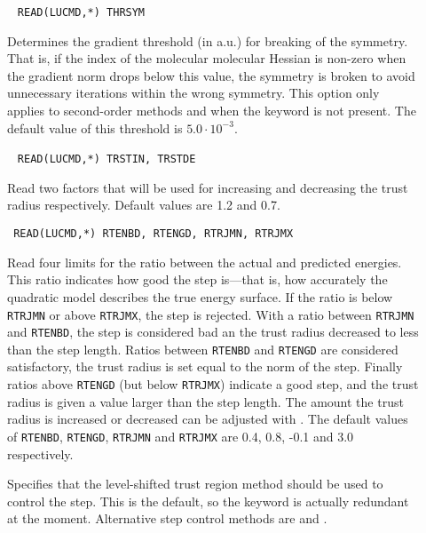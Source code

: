\begin{description}
\item[]\verb| |
\newline
\verb|READ(LUCMD,*) THRSYM|

Determines the gradient threshold (in a.u.) for breaking of the
symmetry. That is, if the index of the
molecular molecular Hessian is non-zero when the gradient norm
drops below this value, the symmetry is broken to avoid unnecessary
iterations within the wrong symmetry. This option only applies to
second-order methods and when the
keyword  is not present. The default value of this
threshold is $5.0\cdot 10^{-3}$.

\item[]\verb| |
\newline
\verb|READ(LUCMD,*) TRSTIN, TRSTDE|

Read two factors that will be used for increasing and decreasing the
trust radius respectively. Default values are
1.2 and 0.7.

\item[]\verb| |
\newline
\verb|READ(LUCMD,*) RTENBD, RTENGD, RTRJMN, RTRJMX|

Read four limits for the ratio between the actual and predicted
energies. This ratio indicates how good the step is---that is, how
accurately the quadratic model describes the true energy
surface. If the ratio is below \verb|RTRJMN| or above
\verb|RTRJMX|, the step is rejected. With a ratio between
\verb|RTRJMN| and \verb|RTENBD|, the step is considered bad an the
trust radius decreased to less than the step
length. Ratios between \verb|RTENBD| and \verb|RTENGD| are
considered satisfactory, the trust radius is set equal to the norm
of the step. Finally ratios above \verb|RTENGD| (but below
\verb|RTRJMX|) indicate a good step, and the trust radius is given
a value larger than the step length. The amount the trust radius
is increased or decreased can be adjusted with . The
default values of \verb|RTENBD|, \verb|RTENGD|, \verb|RTRJMN| and
\verb|RTRJMX| are 0.4, 0.8, -0.1 and 3.0 respectively.

\item[]
Specifies that the level-shifted trust region method should be used to
control the step. This is the default, so the keyword is actually
redundant at the moment. Alternative step control methods are 
and .


\end{description}

